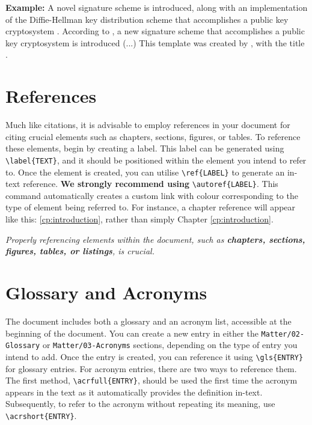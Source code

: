 {\noindent\textbf{Example:} A novel signature scheme is introduced, along with an implementation of the Diffie-Hellman key distribution scheme that accomplishes a public key cryptosystem \citep{Elgamal1985}. According to \citet{Elgamal1985}, a new signature scheme that accomplishes a public key cryptosystem is introduced (...) This template was created by \citeauthor{IPLeiriaThesis}, with the title .

\section{References}
Much like citations, it is advisable to employ references in your document for citing crucial elements such as chapters, sections, figures, or tables. To reference these elements, begin by creating a label. This label can be generated using \verb|\label{TEXT}|, and it should be positioned within the element you intend to refer to. Once the element is created, you can utilise \verb|\ref{LABEL}| to generate an in-text reference. \textbf{We strongly recommend using} \verb|\autoref{LABEL}|. This command automatically creates a custom link with colour corresponding to the type of element being referred to. For instance, a chapter reference will appear like this: \autoref{cp:introduction}, rather than simply Chapter \ref{cp:introduction}. 

\begin{block}[tip]
\textit{Properly referencing elements within the document, such as \textbf{chapters, sections, figures, tables, or listings}, is crucial.}
\end{block}

\section{Glossary and Acronyms}
The document includes both a glossary and an acronym list, accessible at the beginning of the document. You can create a new entry in either the \verb|Matter/02-Glossary| or \verb|Matter/03-Acronyms| sections, depending on the type of entry you intend to add. Once the entry is created, you can reference it using \verb|\gls{ENTRY}| for glossary entries. For acronym entries, there are two ways to reference them. The first method, \verb|\acrfull{ENTRY}|, should be used the first time the acronym appears in the text as it automatically provides the definition in-text. Subsequently, to refer to the acronym without repeating its meaning, use \verb|\acrshort{ENTRY}|.

}
